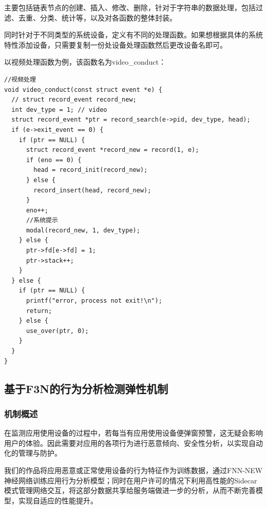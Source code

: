 \documentclass[12pt,a4paper]{ctexart}
\begin{document}
主要包括链表节点的创建、插入、修改、删除，针对于字符串的数据处理，包括过滤、去重、分类、统计等，以及对各函数的整体封装。


同时针对于不同类型的系统设备，定义有不同的处理函数。如果想根据具体的系统特性添加设备，只需要复制一份处设备处理函数然后更改设备名即可。


以视频处理函数为例，该函数名为video\_conduct：
\begin{lstlisting}
//视频处理
void video_conduct(const struct event *e) {
  // struct record_event record_new;
  int dev_type = 1; // video
  struct record_event *ptr = record_search(e->pid, dev_type, head);
  if (e->exit_event == 0) {
    if (ptr == NULL) {
      struct record_event *record_new = record(1, e);
      if (eno == 0) {
        head = record_init(record_new);
      } else {
        record_insert(head, record_new);
      }
      eno++;
      //系统提示
      modal(record_new, 1, dev_type);
    } else {
      ptr->fd[e->fd] = 1;
      ptr->stack++;
    }
  } else {
    if (ptr == NULL) {
      printf("error, process not exit!\n");
      return;
    } else {
      use_over(ptr, 0);
    }
  }
}
\end{lstlisting}
\subsection{基于F3N的行为分析检测弹性机制}
\subsubsection{机制概述}
在监测应用使用设备的过程中，若每当有应用使用设备便弹窗预警，这无疑会影响用户的体验。因此需要对应用的各项行为进行恶意倾向、安全性分析，以实现自动化的管理与防护。\par
我们的作品将应用恶意或正常使用设备的行为特征作为训练数据，通过FNN-NEW神经网络训练应用行为分析模型；同时在用户许可的情况下利用高性能的Sidecar模式管理网络交互，将这部分数据共享给服务端做进一步的分析，从而不断完善模型，实现自适应的性能提升。
\end{document}
